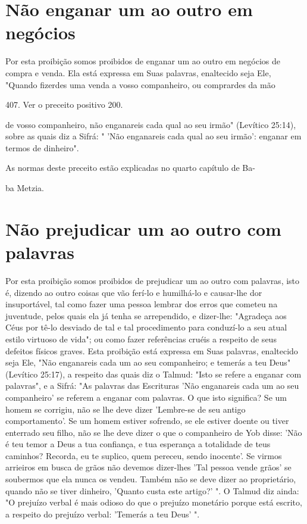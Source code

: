 \begin{itemize}
\begin{enumrate}
\begin{itemize}
\begin{itemize}
\begin{itemize}
\section{Não enganar um ao outro em negócios}

Por esta proibição somos proibidos de enganar um ao outro em ne­gócios
de compra e venda. Ela está expressa em Suas palavras, enaltecido seja
Ele, "Quando fizerdes uma venda a vosso companheiro, ou comprardes da
mão

407. Ver o preceito positivo 200.


de vosso companheiro, não enganareis cada qual ao seu irmão" (Levítico
25:14), sobre as quais diz a Sifrá: " 'Não enganareis cada qual ao seu
irmão': enganar em termos de dinheiro".


As normas deste preceito estão explicadas no quarto capítulo de Ba-


ba Metzia.

\section{Não prejudicar um ao outro com palavras}

Por esta proibição somos proibidos de prejudicar um ao outro com
palavras, isto é, dizendo ao outro coisas que vão ferí-lo e humilhá-lo e
causar-lhe dor insuportável, tal como fazer uma pessoa lembrar dos erros
que come­teu na juventude, pelos quais ela já tenha se arrependido, e
dizer-lhe: "Agrade­ça aos Céus por tê-lo desviado de tal e tal
procedimento para conduzí-lo a seu atual estilo virtuoso de vida"; ou
como fazer referências cruéis a respeito de seus defeitos físicos
graves. Esta proibição está expressa em Suas palavras, enal­tecido seja
Ele, "Não enganareis cada um ao seu companheiro; e temerás a teu Deus"
(Levítico 25:17), a respeito das quais diz o Talmud: "Isto se refere a
en­ganar com palavras", e a Sifrá: "As palavras das Escrituras 'Não
enganareis cada um ao seu companheiro' se referem a enganar com
palavras. O que isto signifi­ca? Se um homem se corrigiu, não se lhe
deve dizer 'Lembre-se de seu antigo comportamento'. Se um homem estiver
sofrendo, se ele estiver doente ou ti­ver enterrado seu filho, não se
lhe deve dizer o que o companheiro de Yob disse: 'Não é teu temor a Deus
a tua confiança, e tua esperança a totalidade de teus caminhos? Recorda,
eu te suplico, quem pereceu, sendo inocente'. Se vir­mos arrieiros em
busca de grãos não devemos dizer-lhes 'Tal pessoa vende grãos' se
soubermos que ela nunca os vendeu. Também não se deve dizer ao
proprie­tário, quando não se tiver dinheiro, 'Quanto custa este artigo?'
". O Talmud diz ainda: "O prejuízo verbal é mais odioso do que o
prejuízo monetário por­que está escrito, a respeito do prejuízo verbal:
'Temerás a teu Deus' ".



\end{itemize}
\end{itemize}
\end{itemize}
\end{enumrate}
\end{itemize}
